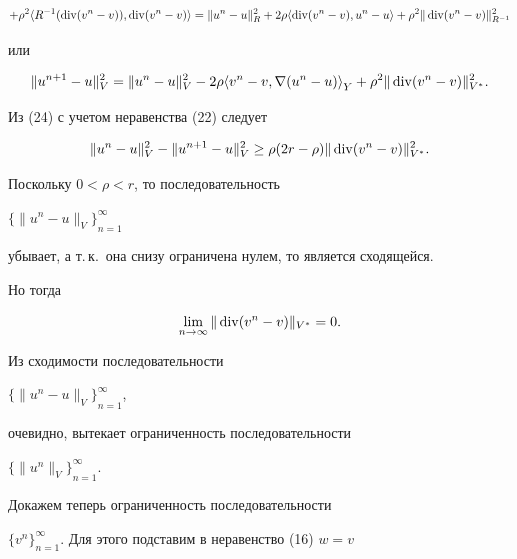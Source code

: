 \begin{pf}
\begin{multline*}
+\rho^{2} {\langle R^{-1}(\Div(v^{n}-v)),\Div(v^{n}-v)\rangle} =


\|u^{n}-u\|^{2}_{R} + 


2 \rho {\langle \Div(v^{n}-v),u^{n}-u \rangle} + \rho^{2} 


\|\Div (v^{n}-v)\|^{2}_{R^{-1}}


\end{multline*}


или


\begin{equation}


\|u^{n+1}-u\|^{2}_{V} = 


\|u^{n}-u\|^{2}_{V} - 


2\rho {\langle v^{n}-v,\nabla (u^{n} - u) \rangle}_{Y} + 


\rho^{2}\|\Div (v^{n}-v)\|^{2}_{V^{*}}. 


\end{equation}


Из (24) с учетом неравенства (22) следует


$$


\|u^{n}-u\|^{2}_{V} - 


\|u^{n+1}-u\|^{2}_{V} \ge 


\rho (2r - \rho)\|\Div(v^{n}-v)\|^{2}_{V^{*}}.


$$


Поскольку $0 < \rho < r$, то последовательность 


$ { \{\|u^{n} - u\|_{V} \} }_{n = 1}^{\infty} $ 


убывает, а т.\,к.~она снизу ограничена нулем, то является сходящейся. 


Но тогда


$$


\lim_{n \to \infty}\|\Div(v^{n}-v)\|_{V^{*}} = 0.


$$


Из сходимости последовательности 


${ \{\|u^{n} - u\|_{V} \} }_{n = 1}^{\infty}$, 


очевидно, вытекает ограниченность последовательности 


$ { \{\|u^{n}\|_{V} \} }_{n = 1}^{\infty}. $ 


 


Докажем теперь ограниченность последовательности 


$\{v^{n}\}_{n = 1}^{\infty}$. Для этого подставим в неравенство (16) $w = v$


$$



\end{pf}
